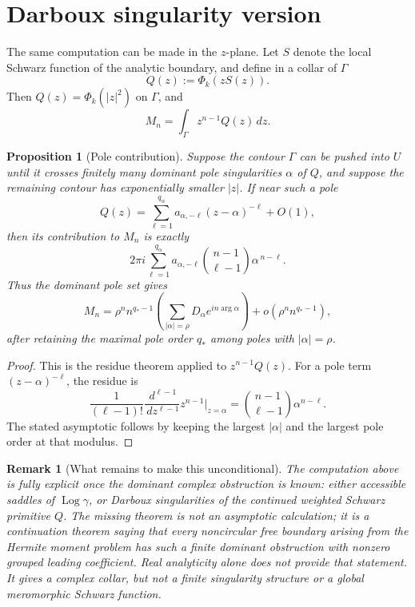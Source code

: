 \documentclass[11pt]{article}
\newtheorem{proposition}[theorem]{Proposition}
\newtheorem{remark}[theorem]{Remark}
\newcommand{\dd}{\,d}
\newcommand{\Log}{\operatorname{Log}}
\begin{document}
\section{Darboux singularity version}

The same computation can be made in the \(z\)-plane.  Let \(S\) denote the local
Schwarz function of the analytic boundary, and define in a collar of \(\Gamma\)
\[
  Q(z):=\Phi_k(zS(z)).
\]
Then \(Q(z)=\Phi_k(|z|^2)\) on \(\Gamma\), and
\[
  M_n=\int_\Gamma z^{n-1}Q(z)\dd z .
\]

\begin{proposition}[Pole contribution]\label{prop:pole}
Suppose the contour \(\Gamma\) can be pushed into \(U\) until it crosses finitely
many dominant pole singularities \(\alpha\) of \(Q\), and suppose the remaining
contour has exponentially smaller \(|z|\).  If near such a pole
\[
  Q(z)=\sum_{\ell=1}^{q_\alpha}
  a_{\alpha,-\ell}(z-\alpha)^{-\ell}+O(1),
\]
then its contribution to \(M_n\) is exactly
\begin{equation}\label{eq:pole-contribution}
  2\pi i
  \sum_{\ell=1}^{q_\alpha}
  a_{\alpha,-\ell}
  \binom{n-1}{\ell-1}
  \alpha^{\,n-\ell}.
\end{equation}
Thus the dominant pole set gives
\[
  M_n
  =
  \rho^n n^{q_*-1}
  \left(\sum_{|\alpha|=\rho}D_\alpha e^{in\arg\alpha}\right)
  +o(\rho^n n^{q_*-1}),
\]
after retaining the maximal pole order \(q_*\) among poles with
\(|\alpha|=\rho\).
\end{proposition}

\begin{proof}
This is the residue theorem applied to \(z^{n-1}Q(z)\).  For a pole term
\((z-\alpha)^{-\ell}\), the residue is
\[
  \frac{1}{(\ell-1)!}
  \frac{\dd^{\ell-1}}{\dd z^{\ell-1}}z^{n-1}\bigg|_{z=\alpha}
  =
  \binom{n-1}{\ell-1}\alpha^{n-\ell}.
\]
The stated asymptotic follows by keeping the largest \(|\alpha|\) and the
largest pole order at that modulus.
\end{proof}

\begin{remark}[What remains to make this unconditional]
The computation above is fully explicit once the dominant complex obstruction is
known: either accessible saddles of \(\Log\gamma\), or Darboux singularities of
the continued weighted Schwarz primitive \(Q\).  The missing theorem is not an
asymptotic calculation; it is a continuation theorem saying that every noncircular
free boundary arising from the Hermite moment problem has such a finite dominant
obstruction with nonzero grouped leading coefficient.  Real analyticity alone
does not provide that statement.  It gives a complex collar, but not a finite
singularity structure or a global meromorphic Schwarz function.
\end{remark}
\end{document}
